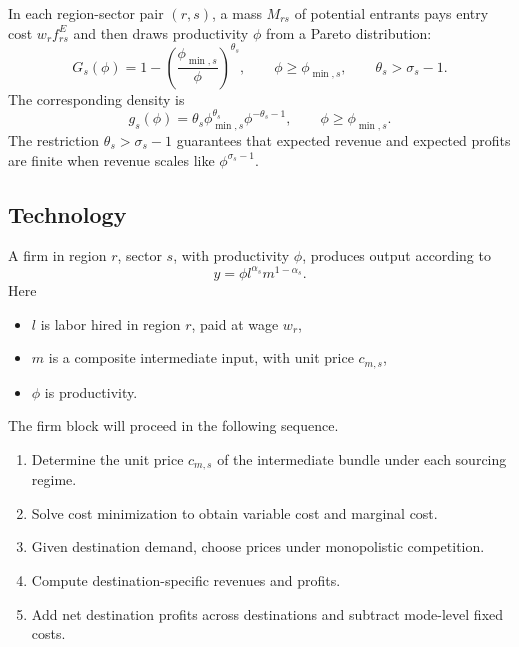 \documentclass[11pt]{article}
\begin{document}
In each region-sector pair \((r,s)\), a mass \(M_{rs}\) of potential entrants pays entry cost \(w_r f^E_{rs}\) and then draws productivity \(\phi\) from a Pareto distribution:
\begin{equation}
G_s(\phi)=1-\left(\frac{\phi_{\min,s}}{\phi}\right)^{\theta_s}, \qquad \phi\ge \phi_{\min,s}, \qquad \theta_s>\sigma_s-1.
\label{eq:pareto_final}
\end{equation}
The corresponding density is
\begin{equation}
g_s(\phi)=\theta_s \phi_{\min,s}^{\theta_s}\phi^{-\theta_s-1}, \qquad \phi\ge \phi_{\min,s}.
\end{equation}
The restriction \(\theta_s>\sigma_s-1\) guarantees that expected revenue and expected profits are finite when revenue scales like \(\phi^{\sigma_s-1}\).

\subsection{Technology}

A firm in region \(r\), sector \(s\), with productivity \(\phi\), produces output according to
\begin{equation}
y = \phi l^{\alpha_s}m^{1-\alpha_s}.
\label{eq:production_final}
\end{equation}
Here
\begin{itemize}[leftmargin=*]
    \item \(l\) is labor hired in region \(r\), paid at wage \(w_r\),
    \item \(m\) is a composite intermediate input, with unit price \(c_{m,s}\),
    \item \(\phi\) is productivity.
\end{itemize}

The firm block will proceed in the following sequence.
\begin{enumerate}[leftmargin=*]
    \item Determine the unit price \(c_{m,s}\) of the intermediate bundle under each sourcing regime.
    \item Solve cost minimization to obtain variable cost and marginal cost.
    \item Given destination demand, choose prices under monopolistic competition.
    \item Compute destination-specific revenues and profits.
    \item Add net destination profits across destinations and subtract mode-level fixed costs.
\end{enumerate}
\end{document}

